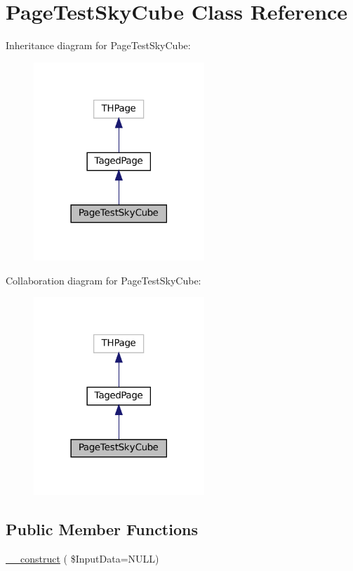 \hypertarget{class_page_test_sky_cube}{}\section{Page\+Test\+Sky\+Cube Class Reference}
\label{class_page_test_sky_cube}


Inheritance diagram for Page\+Test\+Sky\+Cube\+:\nopagebreak
\begin{figure}[H]
\begin{center}
\leavevmode
\includegraphics[width=182pt]{class_page_test_sky_cube__inherit__graph}
\end{center}
\end{figure}


Collaboration diagram for Page\+Test\+Sky\+Cube\+:\nopagebreak
\begin{figure}[H]
\begin{center}
\leavevmode
\includegraphics[width=182pt]{class_page_test_sky_cube__coll__graph}
\end{center}
\end{figure}
\subsection*{Public Member Functions}
\begin{DoxyCompactItemize}
\item 
\hyperlink{class_page_test_sky_cube_aa0f83f12c60b713d7e34da2596e30cdb}{\+\_\+\+\_\+construct} ( \$Input\+Data=N\+U\+LL)
\end{DoxyCompactItemize}

